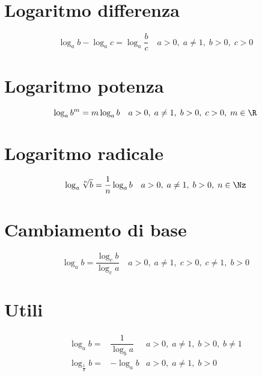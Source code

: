 \section{Logaritmo differenza}
\begin{equation}
\log_{a}b-\log_{a}c=\log_{a}\dfrac{b}{c}\quad a>0,\;a\neq 1,\;b>0,\;c>0 
\end{equation}
\section{Logaritmo potenza}
\begin{equation}
\log_{a}b^m=m\log_{a}b\quad a>0,\;a\neq 1,\;b>0,\;c>0,\;m\in\R
\end{equation}
\section{Logaritmo radicale}
\begin{equation}
\log_{a}\sqrt[n]{b}=\dfrac{1}{n}\log_{a}b\quad a>0,\;a\neq 1,\;b>0,\;n\in\Nz
\end{equation}
\section{Cambiamento di base}
\begin{equation}
\log_{a}b=\dfrac{\log_{c}b}{\log_{c}a}\quad a>0,\;a\neq 1,\;c>0,\;c\neq 1,\;b>0
\end{equation}
\section{Utili}
\begin{align}
\log_{a}b=&\dfrac{1}{\log_{b}a}&a>0,\;a\neq 1,\;b>0,\;b\neq 1\\
\log_{\frac{1}{a}}b=&-\log_{a}b&a>0,\;a\neq 1,\;b>0
\end{align}
